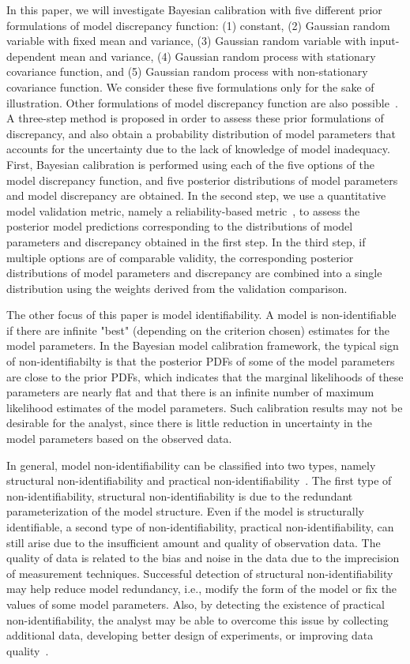 \documentclass[preprint,review,12pt,3p]{elsarticle}
\begin{document}
In this paper, we will investigate Bayesian calibration with five different prior formulations of model discrepancy function: (1) constant, (2) Gaussian random variable with fixed mean and variance, (3) Gaussian random variable with input-dependent mean and variance, (4) Gaussian random process with stationary covariance function, and (5) Gaussian random process with non-stationary covariance function. We consider these five formulations only for the sake of illustration. Other formulations of model discrepancy function are also possible~\citep{DeCarlo2013,Arhonditsis2008}. A three-step method is proposed in order to assess these prior formulations of discrepancy, and also obtain a probability distribution of model parameters that accounts for the uncertainty due to the lack of knowledge of model inadequacy. First, Bayesian calibration is performed using each of the five options of the model discrepancy function, and five posterior distributions of model parameters and model discrepancy are obtained. In the second step, we use a quantitative model validation metric, namely a reliability-based metric~\citep{Rebba2008}, to assess the posterior model predictions corresponding to the distributions of model parameters and discrepancy obtained in the first step. In the third step, if multiple options are of comparable validity, the corresponding  posterior distributions of model parameters and discrepancy are combined into a single distribution using the weights derived from the validation comparison.

The other focus of this paper is model identifiability. A model is non-identifiable if there are infinite "best" (depending on the criterion chosen) estimates for the model parameters. In the Bayesian model calibration framework, the typical sign of non-identifiabilty is that the posterior PDFs of some of the model parameters are close to the prior PDFs, which indicates that the marginal likelihoods of these parameters are nearly flat and that there is an infinite number of maximum likelihood estimates of the model parameters. Such calibration results may not be desirable for the analyst, since there is little reduction in uncertainty in the model parameters based on the observed data. 

In general, model non-identifiability can be classified into two types, namely structural non-identifiability and practical non-identifiability~\citep{Raue2009}. The first type of non-identifiability, structural non-identifiability is due to the redundant parameterization of the model structure. Even if the model is structurally identifiable, a second type of non-identifiability, practical non-identifiability, can still arise due to the insufficient amount and quality of observation data. The quality of data is related to the bias and noise in the data due to the imprecision of measurement techniques. Successful detection of structural non-identifiability may help reduce model redundancy, i.e., modify the form of the model or fix the values of some model parameters. Also, by detecting the existence of practical non-identifiability, the analyst may be able to overcome this issue by collecting additional data, developing better design of experiments, or improving data quality~\citep{Arendt2012a}.
\end{document}
